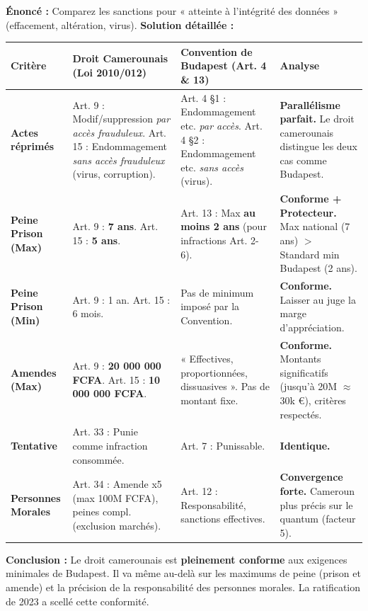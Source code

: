 \documentclass[11pt]{article}
\begin{document}
\begin{exoresolu}
    \textbf{Énoncé :} Comparez les sanctions pour « atteinte à l'intégrité des données » (effacement, altération, virus).
    \tcblower
    \textbf{Solution détaillée :}
    \begin{center}
    \begin{tabularx}{\linewidth}{|l|X|X|X|}
    \hline
    \rowcolor{popblueL}
    \textbf{Critère} & \textbf{Droit Camerounais (Loi 2010/012)} & \textbf{Convention de Budapest (Art. 4 \& 13)} & \textbf{Analyse} \\
    \hline
    \textbf{Actes réprimés} & Art. 9 : Modif/suppression \emph{par accès frauduleux}. Art. 15 : Endommagement \emph{sans accès frauduleux} (virus, corruption). & Art. 4 §1 : Endommagement etc. \emph{par accès}. Art. 4 §2 : Endommagement etc. \emph{sans accès} (virus). & \textbf{Parallélisme parfait.} Le droit camerounais distingue les deux cas comme Budapest. \\
    \hline
    \textbf{Peine Prison (Max)} & Art. 9 : \textbf{7 ans}. Art. 15 : \textbf{5 ans}. & Art. 13 : Max \textbf{au moins 2 ans} (pour infractions Art. 2-6). & \textbf{Conforme + Protecteur.} Max national (7 ans) $>$ Standard min Budapest (2 ans). \\
    \hline
    \textbf{Peine Prison (Min)} & Art. 9 : 1 an. Art. 15 : 6 mois. & Pas de minimum imposé par la Convention. & \textbf{Conforme.} Laisser au juge la marge d'appréciation. \\
    \hline
    \textbf{Amendes (Max)} & Art. 9 : \textbf{20 000 000 FCFA}. Art. 15 : \textbf{10 000 000 FCFA}. & « Effectives, proportionnées, dissuasives ». Pas de montant fixe. & \textbf{Conforme.} Montants significatifs (jusqu'à 20M $\approx$ 30k €), critères respectés. \\
    \hline
    \textbf{Tentative} & Art. 33 : Punie comme infraction consommée. & Art. 7 : Punissable. & \textbf{Identique.} \\
    \hline
    \textbf{Personnes Morales} & Art. 34 : Amende x5 (max 100M FCFA), peines compl. (exclusion marchés). & Art. 12 : Responsabilité, sanctions effectives. & \textbf{Convergence forte.} Cameroun plus précis sur le quantum (facteur 5). \\
    \hline
    \end{tabularx}
    \end{center}
    \textbf{Conclusion :} Le droit camerounais est \textbf{pleinement conforme} aux exigences minimales de Budapest. Il va même au-delà sur les maximums de peine (prison et amende) et la précision de la responsabilité des personnes morales. La ratification de 2023 a scellé cette conformité.
\end{exoresolu}
\end{document}
